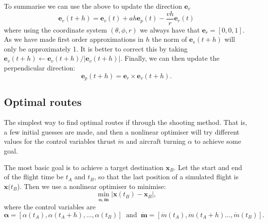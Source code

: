 \documentclass{article}
\renewcommand{\vec}[1]{\boldsymbol{#1}}
\begin{document}
 
To summarise we can use the above to update the direction $\vec e_v$
\begin{equation}
    \vec e_v(t+h) = \vec e_v(t) + a h \vec e_p(t) - \frac{v h}{r} \vec e_r(t)
\end{equation}
where using the coordinate system $(\theta,\phi,r)$ we always have that $\vec e_r = [0,0,1]$. As we have made first order approximations in $h$ the norm of $\vec e_v(t+h)$ will only be approximately 1. It is better to correct this by taking $ \vec e_v(t+h)  \leftarrow  \vec e_v(t+h) / | \vec e_v(t+h) |$. Finally, we can then update the perpendicular direction:
\begin{equation}
    \vec e_p(t+h) = \vec e_r \times \vec e_v(t+h).
\end{equation}



\subsection{Optimal routes}

The simplest way to find optimal routes if through the shooting method. That is, a few initial guesses are made, and then a nonlinear optimiser will try different values for the control variables thrust $\dot m$ and aircraft turning $\alpha$ to achieve some goal. 

The most basic goal is to achieve a target destination $\vec x_B$. Let the start and end of the flight time be $t_A$ and $t_B$, so that the last position of a simulated flight is $\vec x(t_B$). Then we use a nonlinear optimiser to minimise:
\[
\min_{\vec \alpha, \dot{\vec m}} | \vec x(t_B) - \vec x_B|,
\]
where the control variables are
\[
\vec \alpha = [\alpha(t_A), \alpha(t_A+h), \ldots, \alpha(t_B)] \;\; \text{and} \;\; 
\dot{\vec m} = [\dot m(t_A), \dot m(t_A+h) \ldots, \dot m(t_B)].
\]
\end{document}
